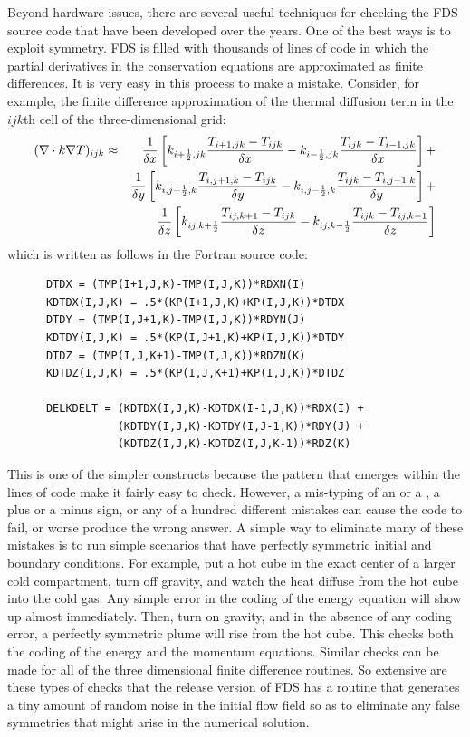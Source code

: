 \documentclass[11pt]{book}
\begin{document}
Beyond hardware issues, there are several useful techniques for checking the FDS source code that have been developed over the years. One of the
best ways is to exploit symmetry. FDS is filled with thousands of lines of code in which the partial derivatives in the conservation equations are
approximated as finite differences. It is very easy in this process to make a mistake. Consider, for example, the finite difference approximation of
the thermal diffusion term in the $ijk$th cell of the three-dimensional grid:
\begin{eqnarray*}
(\nabla \cdot k \nabla T)_{ijk} &\approx&
              \frac{1}{\delta x}
         \left[k_{i+\frac{1}{2},jk}\frac{T_{i+1,jk}-T_{ijk}}{\delta x}
              -k_{i-\frac{1}{2},jk}\frac{T_{ijk}-T_{i-1,jk}}{\delta x}\right]+  \nonumber \\
            &&\frac{1}{\delta y}
         \left[k_{i,j+\frac{1}{2},k}\frac{T_{i,j+1,k}-T_{ijk}}{\delta y}
              -k_{i,j-\frac{1}{2},k}\frac{T_{ijk}-T_{i,j-1,k}}{\delta y}\right]+ \nonumber \\
            &&\frac{1}{\delta z}
         \left[k_{ij,k+\frac{1}{2}}\frac{T_{ij,k+1}-T_{ijk}}{\delta z}
              -k_{ij,k-\frac{1}{2}}\frac{T_{ijk}-T_{ij,k-1}}{\delta z}\right]
\end{eqnarray*}
which is written as follows in the Fortran source code:
\begin{lstlisting}
      DTDX = (TMP(I+1,J,K)-TMP(I,J,K))*RDXN(I)
      KDTDX(I,J,K) = .5*(KP(I+1,J,K)+KP(I,J,K))*DTDX
      DTDY = (TMP(I,J+1,K)-TMP(I,J,K))*RDYN(J)
      KDTDY(I,J,K) = .5*(KP(I,J+1,K)+KP(I,J,K))*DTDY
      DTDZ = (TMP(I,J,K+1)-TMP(I,J,K))*RDZN(K)
      KDTDZ(I,J,K) = .5*(KP(I,J,K+1)+KP(I,J,K))*DTDZ

      DELKDELT = (KDTDX(I,J,K)-KDTDX(I-1,J,K))*RDX(I) +
                 (KDTDY(I,J,K)-KDTDY(I,J-1,K))*RDY(J) +
                 (KDTDZ(I,J,K)-KDTDZ(I,J,K-1))*RDZ(K)
\end{lstlisting}
This is one of the simpler constructs because the pattern that emerges within the lines of code make it fairly easy to check. However, a mis-typing
of an  or a , a plus or a minus sign, or any of a hundred different mistakes can cause the code to fail, or worse produce the wrong
answer. A simple way to eliminate many of these mistakes is to run simple scenarios that have perfectly symmetric initial and boundary conditions.
For example, put a hot cube in the exact center of a larger cold compartment, turn off gravity, and watch the heat diffuse from the hot cube into the
cold gas. Any simple error in the coding of the energy equation will show up almost immediately. Then, turn on gravity, and in the absence of any
coding error, a perfectly symmetric plume will rise from the hot cube. This checks both the coding of the energy and the momentum equations. Similar
checks can be made for all of the three dimensional finite difference routines. So extensive are these types of checks that the release version of
FDS has a routine that generates a tiny amount of random noise in the initial flow field so as to eliminate any false symmetries that might arise in
the numerical solution.
\end{document}
